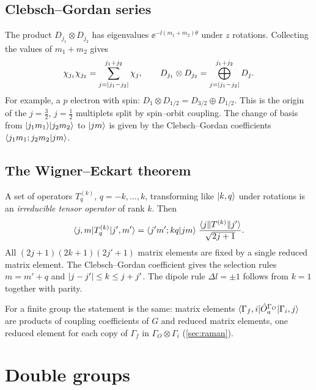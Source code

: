 \subsection{Clebsch--Gordan series}
The product $D_{j_1}\otimes D_{j_2}$ has eigenvalues
$\ee^{-\ii(m_1+m_2)\theta}$ under $z$ rotations. Collecting the values of $m_1+m_2$ gives
\begin{equation}
\chi_{j_1}\chi_{j_2}=\sum_{j=\lvert j_1-j_2\rvert}^{j_1+j_2}\chi_j,\qquad
D_{j_1}\otimes D_{j_2}=\bigoplus_{j=\lvert j_1-j_2\rvert}^{j_1+j_2}D_j .
\end{equation}
For example, a $p$ electron with spin: $D_1\otimes D_{1/2}=D_{3/2}\oplus D_{1/2}$. This is
the origin of the $j=\tfrac32$, $j=\tfrac12$ multiplets split by spin--orbit coupling. The
change of basis from $\lvert j_1m_1\rangle\lvert j_2m_2\rangle$ to $\lvert jm\rangle$ is given by the
Clebsch--Gordan coefficients $\langle j_1m_1;j_2m_2\vert jm\rangle$.

\subsection{The Wigner--Eckart theorem}\label{sec:wignereckart}
A set of operators $T^{(k)}_q$, $q=-k,\dots,k$, transforming like $\lvert k,q\rangle$ under
rotations is an \emph{irreducible tensor operator} of rank $k$. Then
\begin{equation}
\langle j,m\rvert T^{(k)}_q\lvert j',m'\rangle=\langle j'm';kq\vert jm\rangle\;
\frac{\langle j\Vert T^{(k)}\Vert j'\rangle}{\sqrt{2j+1}} .
\end{equation}
All $(2j+1)(2k+1)(2j'+1)$ matrix elements are fixed by a single reduced matrix element.
The Clebsch--Gordan coefficient gives the selection rules $m=m'+q$ and
$\lvert j-j'\rvert\le k\le j+j'$. The dipole rule $\Delta l=\pm1$ follows from $k=1$ together
with parity.

For a finite group the statement is the same: matrix elements
$\langle \Gamma_f,i\rvert\hat{O}^{\Gamma_O}_a\lvert \Gamma_i,j\rangle$ are products of coupling coefficients
of $G$ and reduced matrix elements, one reduced element for each copy of $\Gamma_f$ in
$\Gamma_O\otimes\Gamma_i$ (\cref{sec:raman}).

\section{Double groups}\label{sec:doublegroups}

